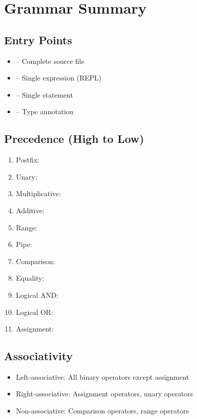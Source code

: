 \section{Grammar Summary}

\subsection{Entry Points}

\begin{itemize}
    \item {} -- Complete source file
    \item {} -- Single expression (REPL)
    \item {} -- Single statement
    \item {} -- Type annotation
\end{itemize}

\subsection{Precedence (High to Low)}

\begin{enumerate}
    \item Postfix: \code{()} \code{[]}  
    \item Unary: \code{-} \code{!} 
    \item Multiplicative: \code{*} \code{/} \code{\%}
    \item Additive: \code{+} \code{-}
    \item Range:  
    \item Pipe: \code{|}
    \item Comparison: \code{<} \code{>} \code{<=} \code{>=}
    \item Equality: \code{==} \code{!=}
    \item Logical AND:  \code{\&\&}
    \item Logical OR:  \code{||}
    \item Assignment: \code{=} \code{+=} \code{-=} \code{*=} \code{/=}
\end{enumerate}

\subsection{Associativity}

\begin{itemize}
    \item Left-associative: All binary operators except assignment
    \item Right-associative: Assignment operators, unary operators
    \item Non-associative: Comparison operators, range operators
\end{itemize}
